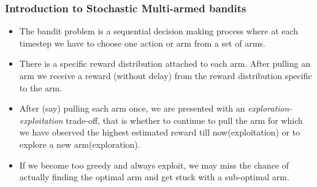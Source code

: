 \begin{frame}
\frametitle{Introduction to Stochastic Multi-armed bandits}
\begin{itemize}
\item<1-> The bandit problem is a sequential decision making process where at each timestep we have to choose one action or arm from a set of arms.
\item<2-> There is a specific reward distribution attached to each arm.  After pulling an arm we receive a reward (without delay) from the reward distribution specific to the arm. 
\item<3-> After (say) pulling each arm once, we are presented with an \emph{exploration-exploitation}  trade-off, that is whether to continue to pull the arm for which we have observed the highest estimated reward till now(exploitation) or to explore a new arm(exploration). 
\item<4-> If we become too greedy and always exploit, we may miss the chance of actually finding the optimal arm and get stuck with a sub-optimal arm.
\end{itemize}
\end{frame}


